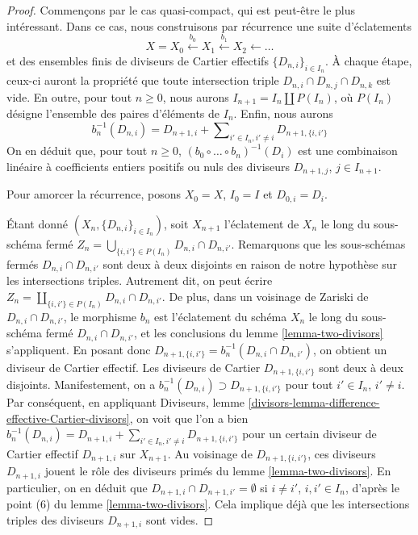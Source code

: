 \begin{proof}
Commençons par le cas quasi-compact, qui est peut-être
le plus intéressant. Dans ce cas, nous construisons par récurrence une suite
d'éclatements
$$
X = X_0 \xleftarrow{b_0} X_1 \xleftarrow{b_1} X_2 \leftarrow \ldots
$$
et des ensembles finis de diviseurs de Cartier effectifs $\{D_{n, i}\}_{i \in I_n}$.
À chaque étape, ceux-ci auront la propriété que toute intersection triple
$D_{n, i} \cap D_{n, j} \cap D_{n, k}$ est vide.
En outre, pour tout $n \geq 0$, nous aurons
$I_{n + 1} = I_n \amalg P(I_n)$, où $P(I_n)$ désigne
l'ensemble des paires d'éléments de $I_n$. Enfin, nous aurons
$$
b_n^{-1}(D_{n, i}) = D_{n + 1, i} +
\sum\nolimits_{i' \in I_n, i' \not = i} D_{n + 1, \{i, i'\}}
$$
On en déduit que, pour tout $n \geq 0$,
$(b_0 \circ \ldots \circ b_n)^{-1}(D_i)$ est une combinaison linéaire
à coefficients entiers positifs ou nuls des diviseurs $D_{n + 1, j}$, $j \in I_{n + 1}$.

\medskip\noindent
Pour amorcer la récurrence, posons $X_0 = X$,
$I_0 = I$ et $D_{0, i} = D_i$.

\medskip\noindent
Étant donné $(X_n, \{D_{n, i}\}_{i \in I_n})$, soit $X_{n + 1}$
l'éclatement de $X_n$ le long du sous-schéma fermé
$Z_n = \bigcup_{\{i, i'\} \in P(I_n)} D_{n, i} \cap D_{n, i'}$.
Remarquons que les sous-schémas fermés $D_{n, i} \cap D_{n, i'}$ sont deux à deux
disjoints en raison de notre hypothèse sur les intersections triples.
Autrement dit, on peut écrire
$Z_n = \coprod_{\{i, i'\} \in P(I_n)} D_{n, i} \cap D_{n, i'}$.
De plus, dans un voisinage de Zariski de $D_{n, i} \cap D_{n, i'}$, le
morphisme $b_n$ est l'éclatement du schéma $X_n$
le long du sous-schéma fermé $D_{n, i} \cap D_{n, i'}$, et les conclusions
du lemme \ref{lemma-two-divisors} s'appliquent.
En posant donc $D_{n + 1, \{i, i'\}} = b_n^{-1}(D_{n, i} \cap D_{n, i'})$,
on obtient un diviseur de Cartier effectif.
Les diviseurs de Cartier $D_{n + 1, \{i, i'\}}$ sont deux à deux disjoints.
Manifestement, on a
$b_n^{-1}(D_{n, i}) \supset D_{n + 1, \{i, i'\}}$ pour
tout $i' \in I_n$, $i' \not = i$. Par conséquent, en appliquant
Diviseurs, lemme \ref{divisors-lemma-difference-effective-Cartier-divisors},
on voit que l'on a bien $b_n^{-1}(D_{n, i}) = D_{n + 1, i} +
\sum\nolimits_{i' \in I_n, i' \not = i} D_{n + 1, \{i, i'\}}$
pour un certain diviseur de Cartier effectif $D_{n + 1, i}$ sur $X_{n + 1}$.
Au voisinage de $D_{n + 1, \{i, i'\}}$, ces diviseurs
$D_{n + 1, i}$ jouent le rôle des diviseurs primés du
lemme \ref{lemma-two-divisors}. En particulier, on en déduit que
$D_{n + 1, i} \cap D_{n + 1, i'} = \emptyset$ si $i \not = i'$,
$i, i' \in I_n$, d'après le point (6) du lemme \ref{lemma-two-divisors}.
Cela implique déjà que les intersections triples
des diviseurs $D_{n + 1, i}$ sont vides.


\end{proof}
